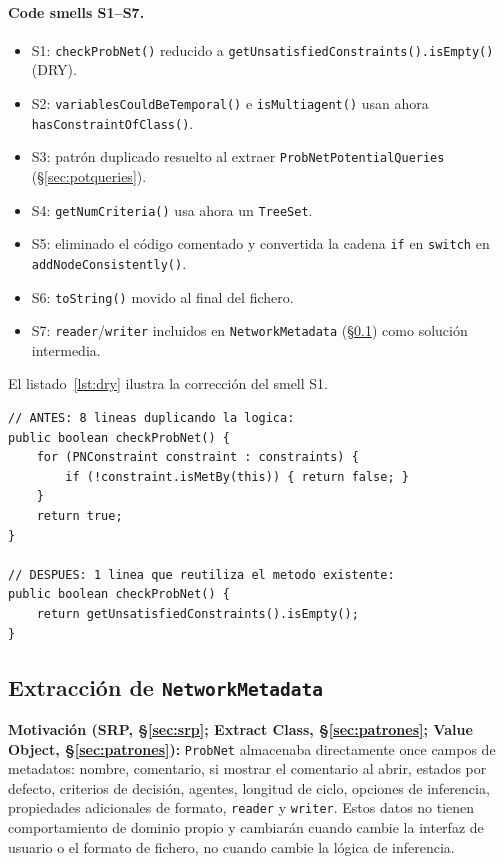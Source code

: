 \documentclass[11pt,a4paper]{article}
\newcommand{\code}[1]{\texttt{#1}}
\begin{document}
\paragraph{Code smells S1--S7.}
\begin{itemize}[nosep]
  \item S1: \code{checkProbNet()} reducido a
        \code{getUnsatisfiedConstraints().isEmpty()} (DRY).
  \item S2: \code{variablesCouldBeTemporal()} e \code{isMultiagent()}
        usan ahora \code{hasConstraintOfClass()}.
  \item S3: patrón duplicado resuelto al extraer
        \code{ProbNetPotentialQueries} (§\ref{sec:potqueries}).
  \item S4: \code{getNumCriteria()} usa ahora un \code{TreeSet}.
  \item S5: eliminado el código comentado y convertida la cadena
        \code{if} en \code{switch} en \code{addNodeConsistently()}.
  \item S6: \code{toString()} movido al final del fichero.
  \item S7: \code{reader}/\code{writer} incluidos en
        \code{NetworkMetadata} (§\ref{sec:metadata}) como solución
        intermedia.
\end{itemize}

El listado~\ref{lst:dry} ilustra la corrección del smell S1.

\begin{lstlisting}[caption={S1: \texttt{checkProbNet()} delega en
                            \texttt{getUnsatisfiedConstraints()} (DRY).},
                   label=lst:dry]
// ANTES: 8 lineas duplicando la logica:
public boolean checkProbNet() {
    for (PNConstraint constraint : constraints) {
        if (!constraint.isMetBy(this)) { return false; }
    }
    return true;
}

// DESPUES: 1 linea que reutiliza el metodo existente:
public boolean checkProbNet() {
    return getUnsatisfiedConstraints().isEmpty();
}
\end{lstlisting}

\subsection{Extracción de \texttt{NetworkMetadata}}
\label{sec:metadata}

\textbf{Motivación (SRP, §\ref{sec:srp}; Extract Class,
§\ref{sec:patrones}; Value Object, §\ref{sec:patrones}):}
\code{ProbNet} almacenaba directamente once campos de metadatos: nombre,
comentario, si mostrar el comentario al abrir, estados por defecto,
criterios de decisión, agentes, longitud de ciclo, opciones de inferencia,
propiedades adicionales de formato, \code{reader} y \code{writer}.
Estos datos no tienen comportamiento de dominio propio y cambiarán cuando
cambie la interfaz de usuario o el formato de fichero, no cuando cambie
la lógica de inferencia.
\end{document}
